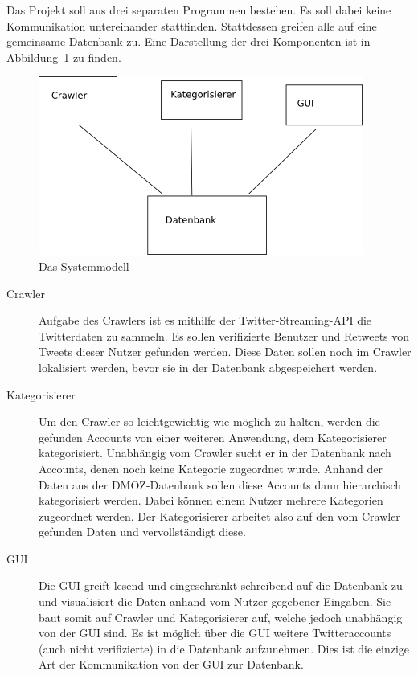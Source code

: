 
Das Projekt soll aus drei separaten Programmen bestehen. Es soll dabei keine Kommunikation untereinander stattfinden. Stattdessen greifen alle auf eine gemeinsame Datenbank zu. Eine Darstellung der drei Komponenten ist in Abbildung~\ref{c:systemmodell} zu finden.

\begin{figure}[h]
	\centering
	\includegraphics{img/systemmodell.png}
	\caption{Das Systemmodell}
	\label{c:systemmodell}
\end{figure}

\begin{description}
	\item[Crawler] Aufgabe des Crawlers ist es mithilfe der Twitter-Streaming-API die Twitterdaten zu sammeln. Es sollen verifizierte Benutzer und Retweets von Tweets dieser Nutzer gefunden werden. Diese Daten sollen noch im Crawler lokalisiert werden, bevor sie in der Datenbank abgespeichert werden.
	\item[Kategorisierer] Um den Crawler so leichtgewichtig wie möglich zu halten, werden die gefunden Accounts von einer weiteren Anwendung, dem Kategorisierer kategorisiert. Unabhängig vom Crawler sucht er in der Datenbank nach Accounts, denen noch keine Kategorie zugeordnet wurde. Anhand der Daten aus der DMOZ-Datenbank sollen diese Accounts dann hierarchisch kategorisiert werden. Dabei können einem Nutzer mehrere Kategorien zugeordnet werden. Der Kategorisierer arbeitet also auf den vom Crawler gefunden Daten und vervollständigt diese.
	\item[GUI] Die GUI greift lesend und eingeschränkt schreibend auf die Datenbank zu und visualisiert die Daten anhand vom Nutzer gegebener Eingaben. Sie baut somit auf Crawler und Kategorisierer auf, welche jedoch unabhängig von der GUI sind. Es ist möglich über die GUI weitere Twitteraccounts (auch nicht verifizierte) in die Datenbank aufzunehmen. Dies ist die einzige Art der Kommunikation von der GUI zur Datenbank.
\end{description}


